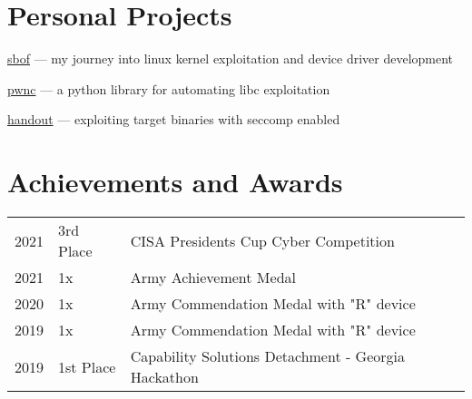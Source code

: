 \documentclass[]{resume}
\begin{document}
\begin{minipage}[t]{0.69\textwidth}
\section{Personal Projects}
\begin{tightemize}
\item \href{https://github.com/jhilbs3/portfolio/tree/main/sbof}{sbof} --- my journey into linux kernel exploitation and device driver development
\item \href{https://github.com/jhilbs3/pwnc}{pwnc} --- a python library for automating libc exploitation
\item \href{https://github.com/jhilbs3/portfolio/tree/main/chals/handout}{handout} --- exploiting target binaries with seccomp enabled

\end{tightemize}

\section{Achievements and Awards}
\begin{tabular}{rll}
2021         & 3rd Place  & CISA Presidents Cup Cyber Competition \\
2021         & 1x         & Army Achievement Medal \\
2020		 & 1x         & Army Commendation Medal with "R" device \\
2019         & 1x         & Army Commendation Medal with "R" device \\
2019         & 1st Place  & Capability Solutions Detachment - Georgia Hackathon
\end{tabular}


\end{minipage}

%
%

\end{document}
